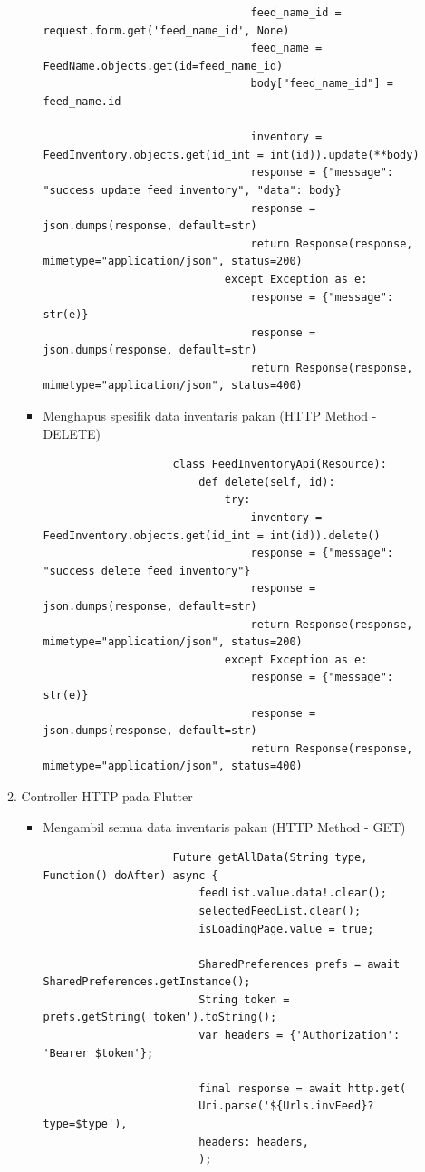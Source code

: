 \begin{spacing}{1.5}
\begin{enumerate}
\begin{enumerate}
\begin{itemize}
\begin{lstlisting}
								feed_name_id = request.form.get('feed_name_id', None)
								feed_name = FeedName.objects.get(id=feed_name_id)
								body["feed_name_id"] = feed_name.id

								inventory = FeedInventory.objects.get(id_int = int(id)).update(**body)
								response = {"message": "success update feed inventory", "data": body}
								response = json.dumps(response, default=str)
								return Response(response, mimetype="application/json", status=200)
							except Exception as e:
								response = {"message": str(e)}
								response = json.dumps(response, default=str)
								return Response(response, mimetype="application/json", status=400)
				\end{lstlisting}

				\item Menghapus spesifik data inventaris pakan (HTTP Method - DELETE)
				
				\begin{lstlisting}
					class FeedInventoryApi(Resource):
						def delete(self, id):
							try:
								inventory = FeedInventory.objects.get(id_int = int(id)).delete()
								response = {"message": "success delete feed inventory"}
								response = json.dumps(response, default=str)
								return Response(response, mimetype="application/json", status=200)
							except Exception as e:
								response = {"message": str(e)}
								response = json.dumps(response, default=str)
								return Response(response, mimetype="application/json", status=400)
				\end{lstlisting}
			\end{itemize}

			\item Controller HTTP pada Flutter
			
			\begin{itemize}
				\item Mengambil semua data inventaris pakan (HTTP Method - GET)
				
				\begin{lstlisting}
					Future getAllData(String type, Function() doAfter) async {
						feedList.value.data!.clear();
						selectedFeedList.clear();
						isLoadingPage.value = true;

						SharedPreferences prefs = await SharedPreferences.getInstance();
						String token = prefs.getString('token').toString();
						var headers = {'Authorization': 'Bearer $token'};

						final response = await http.get(
						Uri.parse('${Urls.invFeed}?type=$type'),
						headers: headers,
						);


\end{lstlisting}
\end{itemize}
\end{enumerate}
\end{enumerate}
\end{spacing}
